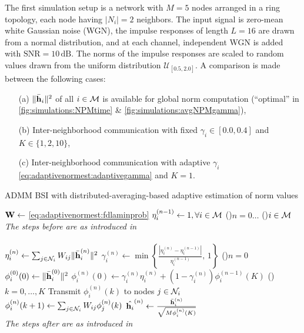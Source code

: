 \documentclass{article}
\begin{document}
The first simulation setup is a network with \(M=5\) nodes arranged in a ring topology, each node having \(|N_i|=2\) neighbors.
The input signal is zero-mean white Gaussian noise (WGN), the impulse responses of length \(L=16\) are drawn from a normal distribution, and at each channel, independent WGN is added with \(\text{SNR}=10\,\text{dB}\).
The norms of the impulse responses are scaled to random values drawn from the uniform distribution \(\mathcal{U}_{[0.5,2.0]}\).
A comparison is made between the following cases:
\begin{itemize}
    \itemsep-0.2em
    \item[(a)] \(\|\bar{\bm{\mathrm{h}}}_i\|^2\) of all \(i \in \mathcal{M}\) is available for global norm computation (``optimal'' in \autoref{fig:simulations:NPMtime} \& \autoref{fig:simulations:avgNPMgamma}),
    \item[(b)] Inter-neighborhood communication with fixed \(\gamma_i \in [0.0, 0.4]\) and \(K \in \{1,2,10\}\),
    \item[(c)] Inter-neighborhood communication with adaptive \(\gamma_i\) \eqref{eq:adaptivenormest:adaptivegamma} and \(K=1\).
\end{itemize}
\begin{algorithm}[t]
    \caption{ADMM BSI with distributed-averaging-based adaptive estimation of norm values}\label{alg:davg_norm_est}
    \(\bm{\mathrm{W}} \gets\) \eqref{eq:adaptivenormest:fdlaminprob}\;
    \(\eta_i^{(n-1)} \gets 1, \forall i \in \mathcal{M}\)\;
    \For(){\(n=0\dots\)}
    {
        \For(){\(i \in \mathcal{M}\)}
        {
            \emph{The steps before are as introduced in }\cite{blochbergerDBSI}\\
            \dotfill\\
            \(\eta_i^{(n)} \gets \sum_{j \in \mathcal{N}_i} W_{ij} \|\bar{\bm{\mathrm{h}}}_i^{(n)}\|^2\)\;
            \(\gamma_i^{(n)} \gets \min \left\lbrace \frac{| \eta_i^{(n)} - \eta_i^{(n-1)} |}{\eta_i^{(n-1)}},\,1\right\rbrace\)\;
            \eIf(){\(n = 0\)}
            {
                \(\phi_i^{(0)}(0) \gets \|\bar{\bm{\mathrm{h}}}_i^{(0)}\|^2\)\;
            }
            {
                \(\phi_i^{(n)}(0) \gets \gamma_i^{(n)} \eta_i^{(n)} + (1-\gamma_i^{(n)}) \phi_i^{(n-1)}(K)\)\;
            }
            \For(){\(k=0,\dots,K\)}
            {
                Transmit \(\phi_i^{(n)}(k)\) to nodes  \(j \in \mathcal{N}_i\)\;
                \(\phi_i^{(n)}({k+1}) \gets \sum_{j \in \mathcal{N}_i} W_{ij} \phi_j^{(n)}({k})\)\;
            }
            \(\hat{\bm{\mathrm{h}}_i}^{(n)} \gets \frac{\bar{\bm{\mathrm{h}}}_i^{(n)}}{\sqrt{M \phi_i^{(n)}(K)}}\)\;
            \dotfill\\
            \emph{The steps after are as introduced in }\cite{blochbergerDBSI}\\
        }
    }
\end{algorithm}
\end{document}
